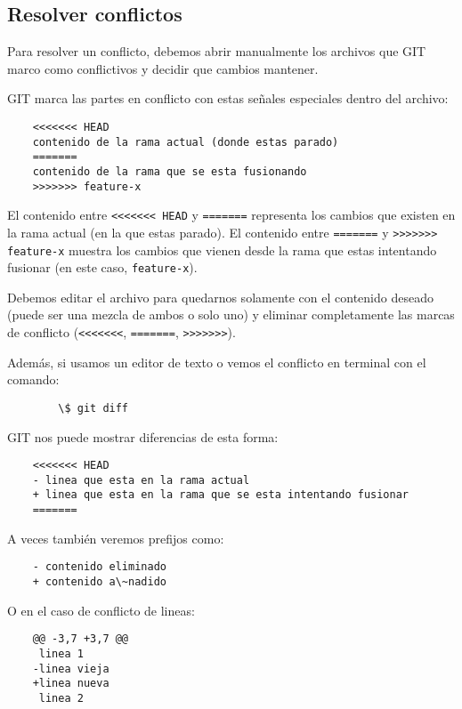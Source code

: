 \subsection{Resolver conflictos}
    Para resolver un conflicto, debemos abrir manualmente los archivos que GIT marco como conflictivos y decidir que cambios mantener.

    GIT marca las partes en conflicto con estas se\~nales especiales dentro del archivo:

    \begin{lstlisting}
    <<<<<<< HEAD
    contenido de la rama actual (donde estas parado)
    =======
    contenido de la rama que se esta fusionando
    >>>>>>> feature-x
    \end{lstlisting}

    El contenido entre \texttt{<<<<<<< HEAD} y \texttt{=======} representa los cambios que existen en la rama actual (en la que estas parado). El contenido entre \texttt{=======} y \texttt{>>>>>>> feature-x} muestra los cambios que vienen desde la rama que estas intentando fusionar (en este caso, \texttt{feature-x}).

    Debemos editar el archivo para quedarnos solamente con el contenido deseado (puede ser una mezcla de ambos o solo uno) y eliminar completamente las marcas de conflicto (\texttt{<<<<<<<}, \texttt{=======}, \texttt{>>>>>>>}).

    Adem\'as, si usamos un editor de texto o vemos el conflicto en terminal con el comando:

    \begin{lstlisting}
        \$ git diff
    \end{lstlisting}

    GIT nos puede mostrar diferencias de esta forma:

    \begin{lstlisting}
    <<<<<<< HEAD
    - linea que esta en la rama actual
    + linea que esta en la rama que se esta intentando fusionar
    =======
    \end{lstlisting}

    A veces tambi\'en veremos prefijos como:

    \begin{lstlisting}
    - contenido eliminado
    + contenido a\~nadido
    \end{lstlisting}

    O en el caso de conflicto de lineas:

    \begin{lstlisting}
    @@ -3,7 +3,7 @@
     linea 1
    -linea vieja
    +linea nueva
     linea 2
    \end{lstlisting}

